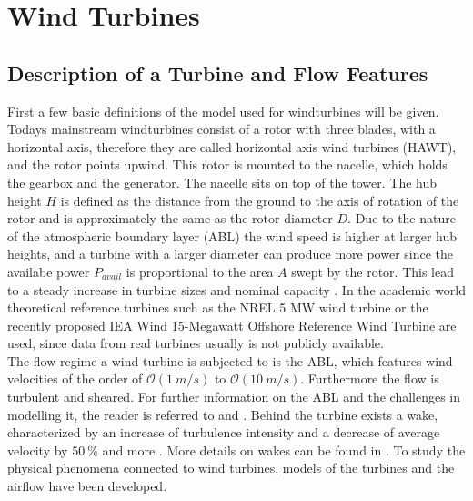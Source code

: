 \section{Wind Turbines}
\subsection{Description of a Turbine and Flow Features}
First a few basic definitions of the model used for windturbines will be given. Todays mainstream windturbines consist of a rotor with three blades, with a horizontal axis, therefore they are called horizontal axis wind turbines (HAWT), and the rotor points upwind.  This rotor is mounted to the nacelle, which holds the gearbox and the generator. The nacelle sits on top of the tower. The hub height $H$ is defined as the distance from the ground to the axis of rotation of the rotor and is approximately the same as the rotor diameter $D$. Due to the nature of the atmospheric boundary layer (ABL) the wind speed is higher at larger hub heights, and a turbine with a larger diameter can produce more power since the availabe power $P_{avail}$ is proportional to the area $A$ swept by the rotor. This lead to a steady increase in turbine sizes and nominal capacity \cite{rohrig_powering_2019}. In the academic world theoretical reference turbines such as the NREL 5 MW wind turbine \cite{jonkman_definition_2009} or the recently proposed IEA Wind 15-Megawatt Offshore Reference Wind Turbine \cite{gaertner_iea_2020} are used, since data from real turbines usually is not publicly available.\cite{hansen_aerodynamics_2008} \\
The flow regime a wind turbine is subjected to is the ABL, which features wind velocities of the order of $\mathcal{O}(\SI{1}{m/s})$ to $\mathcal{O}(\SI{10}{m/s})$. Furthermore the flow is turbulent and sheared. For further information on the ABL and the challenges in modelling it, the reader is referred to \cite{kaimal_atmospheric_1994} and \cite{holtslag_stable_2013}. Behind the turbine exists a wake, characterized by an increase of turbulence intensity and a decrease of average velocity by $\SI{50}{\percent}$ and more \cite{abkar_wake_2016-1}. More details on wakes can be found in \cite{boersma_tutorial_2017}. To study the physical phenomena connected to wind turbines, models of the turbines and the airflow have been developed.
